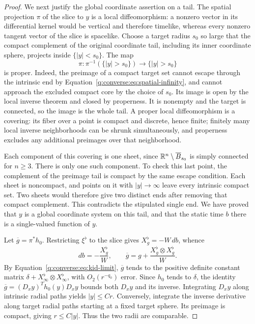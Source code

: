 \begin{proof}
We next justify the global coordinate assertion on a tail.
The spatial projection $\pi$ of the slice to $y$ is a local
diffeomorphism: a nonzero vector in its differential kernel would be
vertical and therefore timelike, whereas every nonzero tangent vector
of the slice is spacelike.  Choose a target radius $s_0$ so large that
the compact complement of the original coordinate tail, including its
inner coordinate sphere, projects inside $\{|y|<s_0\}$.
The map
\[
 \pi:\pi^{-1}(\{|y|>s_0\})\longrightarrow\{|y|>s_0\}
\]
is proper.  Indeed, the preimage of a compact target set cannot escape
through the intrinsic end by
Equation~\eqref{q:converse:eq:spatial-infinity}, and cannot approach the
excluded compact core by the choice of $s_0$.
Its image is open by the local inverse theorem and closed by
properness.  It is nonempty and the target is connected, so the image
is the whole tail.  A proper local diffeomorphism is a covering: its
fiber over a point is compact and discrete, hence finite; finitely many
local inverse neighborhoods can be shrunk simultaneously, and
properness excludes any additional preimages over that neighborhood.

Each component of this covering is one sheet, since
$\mathbb R^n\setminus\overline B_{s_0}$ is simply connected for $n\ge3$.
There is only one such component.  To check this last point, the
complement of the preimage tail is compact by the same escape
condition.  Each sheet is noncompact, and points on it with
$|y|\to\infty$ leave every intrinsic compact set.  Two sheets would
therefore give two distinct ends after removing that compact
complement.  This contradicts the stipulated single end.  We have
proved that $y$ is a global coordinate system on this tail, and that
the static time $b$ there is a single-valued function of $y$.

Let $\overline g=\pi^*h_0$.  Restricting $\xi^\flat$ to the slice gives
$X_g^\flat=-W\,db$, whence
\begin{equation}
 db=-\frac{X_g^\flat}{W},\qquad
 \overline g=g+\frac{X_g^\flat\otimes X_g^\flat}{W}.
 \label{q:converse:eq:base-pullback}
\end{equation}
By Equation~\eqref{q:converse:eq:kid-limit}, $\overline g$ tends to the
positive definite constant matrix
$\delta+X_\infty^\flat\otimes X_\infty^\flat$, with
$O_2(r^{-q_0})$ error.  Since $h_0$ tends to $\delta$, the identity
$\overline g=(D_xy)^T h_0(y)D_xy$ bounds both $D_xy$ and its inverse.
Integrating $D_xy$ along intrinsic radial paths yields $|y|\le Cr$.
Conversely, integrate the inverse derivative along target radial paths
starting at a fixed target sphere.  Its preimage is compact, giving
$r\le C|y|$.  Thus the two radii are comparable.


\end{proof}
